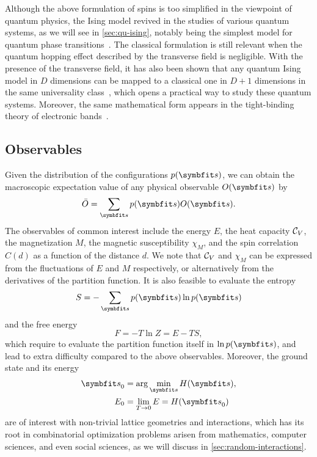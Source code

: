 Although the above formulation of spins is too simplified in the viewpoint of quantum physics, the Ising model revived in the studies of various quantum systems, as we will see in \cref{sec:qu-ising}, notably being the simplest model for quantum phase transitions~\cite{sachdev2001quantum}. The classical formulation is still relevant when the quantum hopping effect described by the transverse field is negligible. With the presence of the transverse field, it has also been shown that any quantum Ising model in $D$ dimensions can be mapped to a classical one in $D + 1$ dimensions in the same universality class~\cite{hertz1976quantum}, which opens a practical way to study these quantum systems. Moreover, the same mathematical form appears in the tight-binding theory of electronic bands~\cite{treglia1988segregation}.

\subsection{Observables}

Given the distribution of the configurations $p(\vs)$, we can obtain the macroscopic expectation value of any physical observable $O(\vs)$ by
\begin{equation}
\bar{O} = \sum_\vs p(\vs) O(\vs).
\label{eq:cl-obs}
\end{equation}
The observables of common interest include the energy $E$, the heat capacity $\mathcal{C}_V$, the magnetization $M$, the magnetic susceptibility $\chi_M$, and the spin correlation $C(d)$ as a function of the distance $d$. We note that $\mathcal{C}_V$ and $\chi_M$ can be expressed from the fluctuations of $E$ and $M$ respectively, or alternatively from the derivatives of the partition function. It is also feasible to evaluate the entropy
\begin{equation}
S = -\sum_\vs p(\vs) \ln p(\vs)
\end{equation}
and the free energy
\begin{equation}
F = -T \ln Z = E - T S,
\end{equation}
which require to evaluate the partition function itself in $\ln p(\vs)$, and lead to extra difficulty compared to the above observables. Moreover, the ground state and its energy
\begin{align}
\vs_0 &= \arg\min_\vs H(\vs), \\
E_0 &= \lim_{T \to 0} E = H(\vs_0)
\end{align}
are of interest with non-trivial lattice geometries and interactions, which has its root in combinatorial optimization problems arisen from mathematics, computer sciences, and even social sciences, as we will discuss in \cref{sec:random-interactions}.

